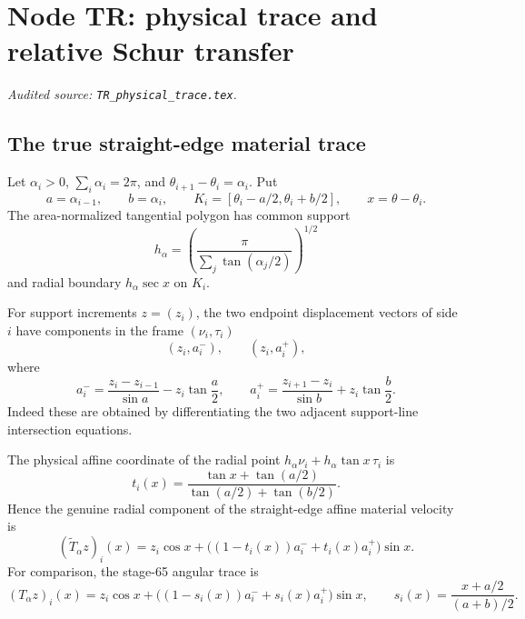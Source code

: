\documentclass[11pt]{amsart}
\numberwithin{equation}{section}
\theoremstyle{definition}
\theoremstyle{remark}
\begin{document}
\begingroup
\section{Node TR: physical trace and relative Schur transfer}
\label{module:TR}
\noindent\textit{Audited source: \nolinkurl{TR_physical_trace.tex}.}
\subsection{The true straight-edge material trace}

Let $\alpha_i>0$, $\sum_i\alpha_i=2\pi$, and
$\theta_{i+1}-\theta_i=\alpha_i$.  Put
\begin{equation}\label{TR:eq:fan}
 a=\alpha_{i-1},\qquad b=\alpha_i,\qquad
 K_i=[\theta_i-a/2,\theta_i+b/2],\qquad x=\theta-\theta_i.
\end{equation}
The area-normalized tangential polygon has common support
\begin{equation}\label{TR:eq:h}
 h_\alpha=\left(\frac\pi{\sum_j\tan(\alpha_j/2)}\right)^{1/2}
\end{equation}
and radial boundary $h_\alpha\sec x$ on $K_i$.

For support increments $z=(z_i)$, the two endpoint displacement vectors
of side $i$ have components in the frame $(\nu_i,\tau_i)$
\begin{equation}\label{TR:eq:endpoint-components}
 (z_i,a_i^-),\qquad (z_i,a_i^+),
\end{equation}
where
\begin{equation}\label{TR:eq:apm}
 a_i^-=\frac{z_i-z_{i-1}}{\sin a}-z_i\tan\frac a2,
 \qquad
 a_i^+=\frac{z_{i+1}-z_i}{\sin b}+z_i\tan\frac b2.
\end{equation}
Indeed these are obtained by differentiating the two adjacent support-line
intersection equations.

The physical affine coordinate of the radial point
$h_\alpha\nu_i+h_\alpha\tan x\,\tau_i$ is
\begin{equation}\label{TR:eq:t}
 t_i(x)=\frac{\tan x+\tan(a/2)}
 {\tan(a/2)+\tan(b/2)}.
\end{equation}
Hence the genuine radial component of the straight-edge affine material
velocity is
\begin{equation}\label{TR:eq:Tphysical}
 (\widetilde{T}_\alpha z)_i(x)
 =z_i\cos x+
 \bigl((1-t_i(x))a_i^-+t_i(x)a_i^+\bigr)\sin x.
\end{equation}
For comparison, the stage-65 angular trace is
\begin{equation}\label{TR:eq:Tangular}
 (T_\alpha z)_i(x)
 =z_i\cos x+
 \bigl((1-s_i(x))a_i^-+s_i(x)a_i^+\bigr)\sin x,
 \qquad
 s_i(x)=\frac{x+a/2}{(a+b)/2}.
\end{equation}
\end{document}
